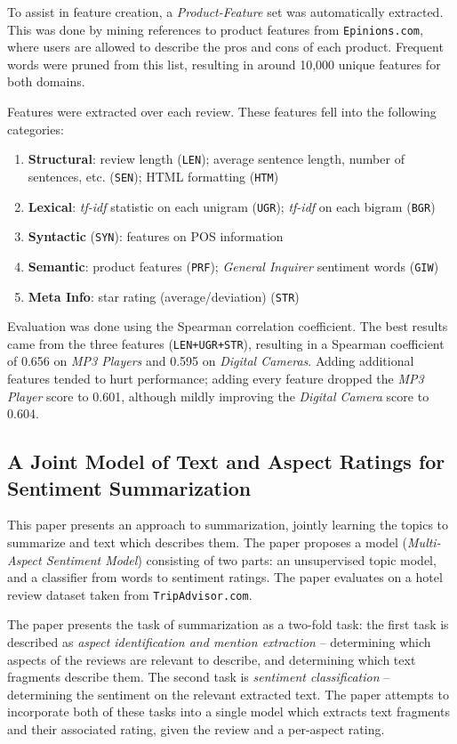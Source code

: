 \documentclass[12pt,letterpaper]{article}
\begin{document}
To assist in feature creation, a {\em Product-Feature} set was automatically extracted.
This was done by mining references to product features from {\tt Epinions.com},
	where users are allowed to describe the pros and cons of each product.
Frequent words were pruned from this list, resulting in around 10,000 unique features
	for both domains.

Features were extracted over each review.
These features fell into the following categories:
\begin{enumerate}
	\item {\bf Structural}: review length ({\tt LEN}); average sentence length, 
		number of sentences, etc. ({\tt SEN}); 
		HTML formatting ({\tt HTM})
	\item {\bf Lexical}: {\it tf-idf} statistic on each unigram ({\tt UGR});
		{\it tf-idf} on each bigram ({\tt BGR})
	\item {\bf Syntactic} ({\tt SYN}): features on POS information
	\item {\bf Semantic}: product features ({\tt PRF}); 
		{\it General Inquirer} sentiment words ({\tt GIW}) 
	\item {\bf Meta Info}: star rating (average/deviation) ({\tt STR})
\end{enumerate}

Evaluation was done using the Spearman correlation coefficient.
The best results came from the three features ({\tt LEN+UGR+STR}),
	resulting in a Spearman coefficient of 0.656 on {\em MP3 Players}
	and 0.595 on {\em Digital Cameras}.
Adding additional features tended to hurt performance; adding every feature
	dropped the {\em MP3 Player} score to 0.601,
	although mildly improving the {\em Digital Camera} score to 0.604.

\subsection{A Joint Model of Text and Aspect Ratings for Sentiment Summarization \cite{2008titov-summarization}}

This paper presents an approach to summarization, jointly learning the topics to summarize and text which
	describes them.
The paper proposes a model ({\em Multi-Aspect Sentiment Model}) consisting of two parts: 
	an unsupervised topic model, and a classifier from words to sentiment ratings.
The paper evaluates on a hotel review dataset taken from {\tt TripAdvisor.com}.

The paper presents the task of summarization as a two-fold task: the first task
	is described as {\em aspect identification and mention extraction} -- determining which aspects of the
	reviews are relevant to describe, and determining which text fragments describe them.
The second task is {\em sentiment classification} -- determining the sentiment on the
	relevant extracted text.
The paper attempts to incorporate both of these tasks into a single model which extracts text fragments
	and their associated rating, given the review and a per-aspect rating.
\end{document}
